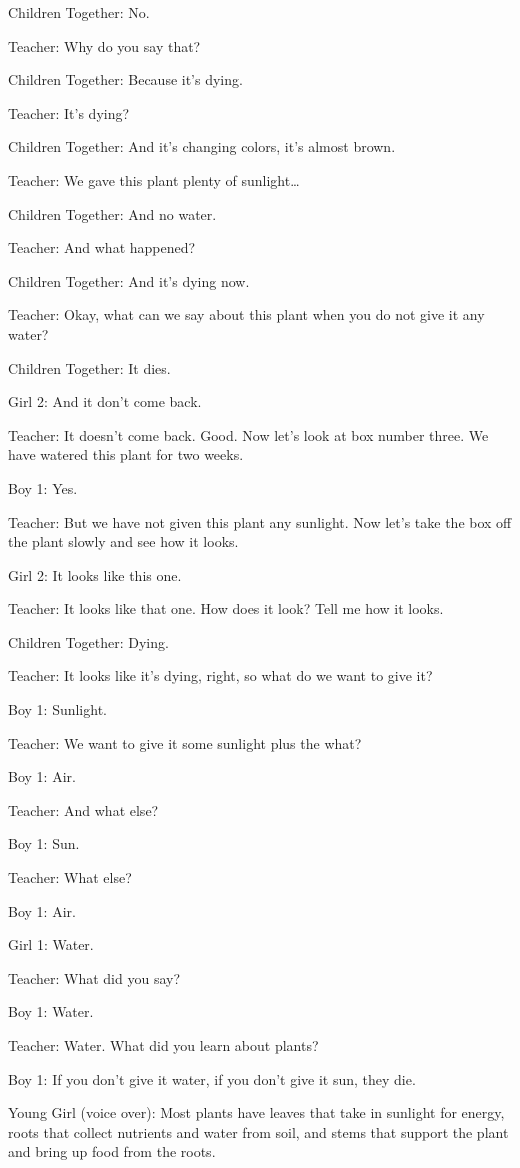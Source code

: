 Children Together: No.

Teacher: Why do you say that?

Children Together: Because it's dying.

Teacher: It's dying?

Children Together: And it's changing colors, it's almost brown.

Teacher: We gave this plant plenty of sunlight\dots

Children Together: And no water.

Teacher: And what happened?

Children Together: And it's dying now.

Teacher: Okay, what can we say about this plant when you do not give it any water?

Children Together: It dies.

Girl 2: And it don't come back.

Teacher: It doesn't come back. Good. Now let's look at box number three. We have watered this plant for two weeks.

Boy 1: Yes.

Teacher: But we have not given this plant any sunlight. Now let's take the box off the plant slowly and see how it looks.

Girl 2: It looks like this one.

Teacher: It looks like that one. How does it look? Tell me how it looks.

Children Together: Dying.

Teacher: It looks like it's dying, right, so what do we want to give it?

Boy 1: Sunlight.

Teacher: We want to give it some sunlight plus the what?

Boy 1: Air.

Teacher: And what else?

Boy 1: Sun.

Teacher: What else?

Boy 1: Air.

Girl 1: Water.

Teacher: What did you say?

Boy 1: Water.

Teacher: Water. What did you learn about plants?

Boy 1: If you don't give it water, if you don't give it sun, they die.

Young Girl (voice over): Most plants have leaves that take in sunlight for energy, roots that collect nutrients and water from soil, and stems that support the plant and bring up food from the roots.

